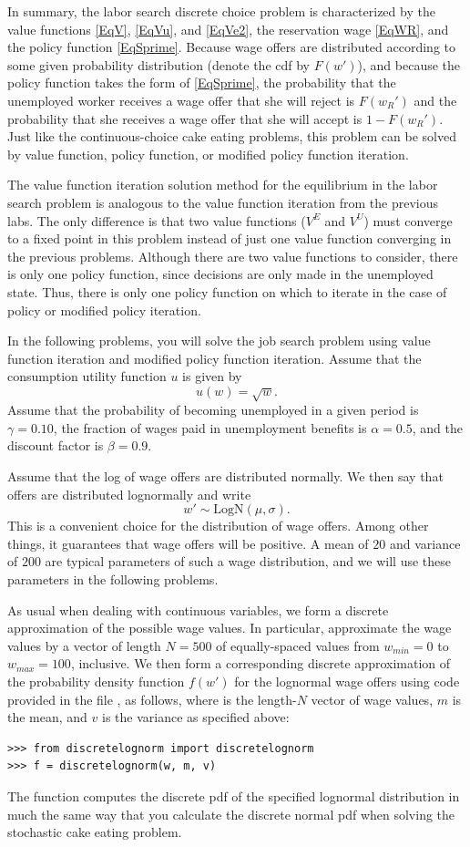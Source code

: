 In summary, the labor search discrete choice problem is characterized by the value functions \eqref{EqV}, \eqref{EqVu},
and \eqref{EqVe2}, the reservation wage \eqref{EqWR}, and the policy function \eqref{EqSprime}. Because wage offers
are distributed according to some given probability distribution (denote the cdf by $F(w')$),
and because the policy function takes the form of \eqref{EqSprime},
the probability that the unemployed worker receives a wage offer that she will reject is $F(w_R')$ and the probability
that she receives a wage offer that she will accept is $1 - F(w_R')$. Just like the continuous-choice cake eating
problems, this problem can be solved by value function, policy function, or modified policy function iteration.

The value function iteration solution method for the equilibrium in the labor search problem is analogous to the
value function iteration from the previous labs. The only difference is that two value functions ($V^E$ and $V^U$)
must converge to a fixed point in this problem instead of just one value function converging in the previous problems.
Although there are two value functions to consider, there is only one policy function, since decisions are only made
in the unemployed state.  Thus, there is only one policy function on which to iterate in the case of policy or modified
policy iteration.

In the following problems, you will solve the job search problem using value function iteration and modified policy
function iteration. Assume that the consumption utility function $u$ is given by
\[
u(w) = \sqrt{w}.
\]
Assume that the probability of becoming unemployed in a given period is $\gamma = 0.10$, the fraction of wages paid
in unemployment benefits is $\alpha = 0.5$, and the discount factor is $\beta = 0.9$.

Assume that the log of wage offers are distributed normally.  We then say that offers are distributed
lognormally and write
\[
w'\sim \text{LogN}(\mu,\sigma).
\]
This is a convenient choice for the distribution of
wage offers.  Among other things, it guarantees that wage offers will be positive.
A mean of $20$ and variance of $200$ are typical parameters of such a wage distribution,
and we will use these parameters in the following problems.

As usual when dealing with continuous variables, we form a discrete approximation of
the possible wage values. In particular, approximate the wage values by a vector of
length $N = 500$ of equally-spaced values from $w_{min} = 0$ to $w_{max} = 100$, inclusive.
We then form a corresponding discrete approximation of the probability density function
$f(w')$ for the lognormal wage offers using code provided in the file ,
as follows, where  is the length-$N$ vector of wage values, $m$ is the mean, and $v$ is
the variance as specified above:
\begin{lstlisting}
>>> from discretelognorm import discretelognorm
>>> f = discretelognorm(w, m, v)
\end{lstlisting}
The function  computes the discrete pdf of the specified lognormal distribution in much
the same way that you calculate the discrete normal pdf when solving the stochastic cake eating problem.



